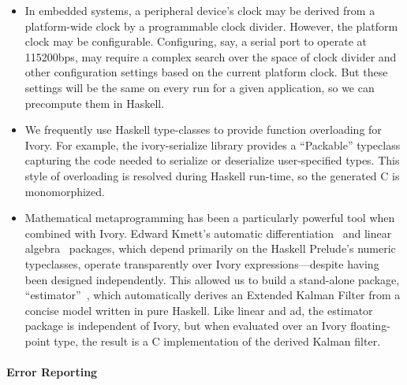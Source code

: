 \begin{itemize}
\item In embedded systems, a peripheral device's clock may be derived from a
  platform-wide clock by a programmable clock divider. However, the platform
  clock may be configurable. Configuring, say, a serial port to operate at
  115200bps, may require a complex search over the space of clock divider and
  other configuration settings based on the current platform clock. But these
  settings will be the same on every run for a given application, so we can
  precompute them in Haskell.
\item We frequently use Haskell type-classes to provide function overloading for
  Ivory. For example, the ivory-serialize library provides a ``Packable''
  typeclass capturing the code needed to serialize or deserialize user-specified
  types. This style of overloading is resolved during Haskell run-time, so the
  generated C is monomorphized.
\item Mathematical metaprogramming has been a particularly powerful tool when combined
with Ivory. Edward Kmett's automatic differentiation~\cite{ad} and linear
algebra~\cite{linear} packages, which depend primarily on the Haskell Prelude's
numeric typeclasses, operate transparently over Ivory expressions---despite
having been designed independently. This allowed us to build a stand-alone
package, ``estimator''~\cite{estimator}, which automatically derives an Extended
Kalman Filter from a concise model written in pure Haskell. Like linear and ad,
the estimator package is independent of Ivory, but when evaluated over an Ivory
floating-point type, the result is a C implementation of the derived Kalman
filter.
\end{itemize}



\paragraph{Error Reporting}

